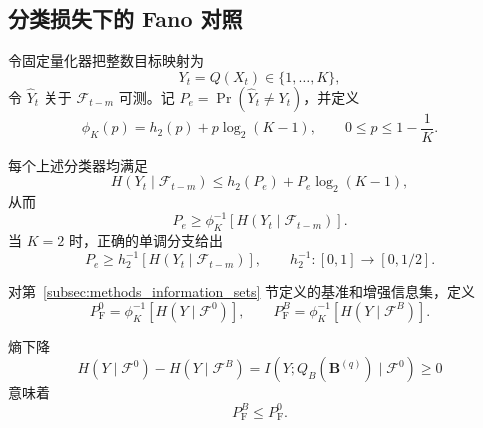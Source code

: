 

\subsection{分类损失下的 Fano 对照}
\label{subsec:fano_counterpart}

令固定量化器把整数目标映射为
\begin{equation}
Y_t=Q(X_t)\in\{1,\ldots,K\},
\label{eq:fano_quantized_target}
\end{equation}
令 \(\widehat Y_t\) 关于 \(\mathcal F_{t-m}\) 可测。记
\(P_e=\Pr(\widehat Y_t\neq Y_t)\)，并定义
\begin{equation}
\phi_K(p)=h_2(p)+p\log_2(K-1),
\qquad 0\leq p\leq1-\frac1K.
\label{eq:fano_phi}
\end{equation}

\begin{Proposition}
\label{prop:fano_error_floor}
每个上述分类器均满足
\begin{equation}
H(Y_t\mid\mathcal F_{t-m})
\leq h_2(P_e)+P_e\log_2(K-1),
\label{eq:fano_conditional_inequality}
\end{equation}
从而
\begin{equation}
P_e\geq
\phi_K^{-1}\!\left[H(Y_t\mid\mathcal F_{t-m})\right].
\label{eq:fano_general_floor}
\end{equation}
当 \(K=2\) 时，正确的单调分支给出
\begin{equation}
P_e\geq
h_2^{-1}\!\left[H(Y_t\mid\mathcal F_{t-m})\right],
\qquad h_2^{-1}:[0,1]\rightarrow[0,1/2].
\label{eq:fano_binary_floor}
\end{equation}
\end{Proposition}

对第~\ref{subsec:methods_information_sets} 节定义的基准和增强信息集，定义
\begin{equation}
P_{\mathrm F}^{0}
=\phi_K^{-1}[H(Y\mid\mathcal F^0)],
\qquad
P_{\mathrm F}^{B}
=\phi_K^{-1}[H(Y\mid\mathcal F^B)].
\label{eq:fano_mobility_floors}
\end{equation}

\begin{Corollary}
\label{cor:mobility_fano_ordering}
熵下降
\begin{equation}
H(Y\mid\mathcal F^0)-H(Y\mid\mathcal F^B)
=I(Y;Q_B(\mathbf B^{(q)})\mid\mathcal F^0)\geq0
\label{eq:fano_mobility_cmi}
\end{equation}
意味着
\begin{equation}
P_{\mathrm F}^{B}\leq P_{\mathrm F}^{0}.
\label{eq:fano_mobility_floor_order}
\end{equation}
\end{Corollary}

